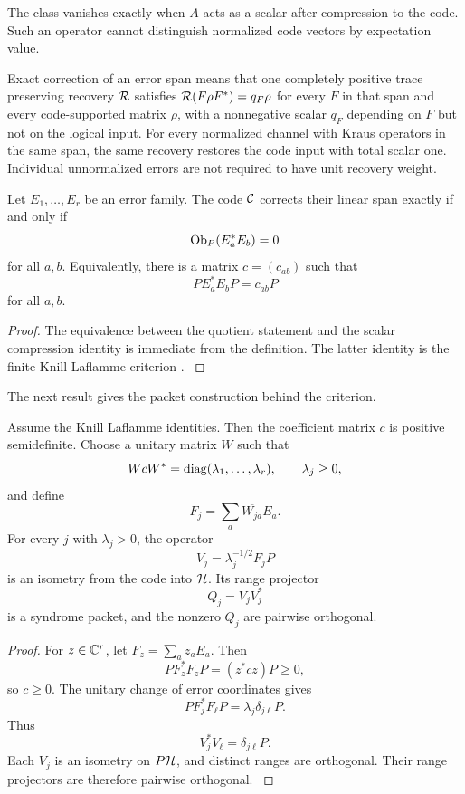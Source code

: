 The class vanishes exactly when \(A\) acts as a scalar after compression to the code. Such an operator cannot distinguish normalized code vectors by expectation value.

Exact correction of an error span means that one completely positive trace preserving recovery $\Rcal$ satisfies $\Rcal(F\rho F^*)=q_F\rho$ for every $F$ in that span and every code-supported matrix $\rho$, with a nonnegative scalar $q_F$ depending on $F$ but not on the logical input. For every normalized channel with Kraus operators in the same span, the same recovery restores the code input with total scalar one. Individual unnormalized errors are not required to have unit recovery weight.

\begin{theorem}\label{strong:theorem:026}\label{strong:thm:kl_obstruction}
Let \(E_1,\ldots,E_r\) be an error family. The code \(\Ccal\) corrects their linear span exactly if and only if
\[
\operatorname{Ob}_P(E_a^*E_b)=0
\]
for all \(a,b\). Equivalently, there is a matrix \(c=(c_{ab})\) such that
\[
PE_a^*E_bP=c_{ab}P
\]
for all \(a,b\).
\end{theorem}

\begin{proof}\label{strong:proof:039}
The equivalence between the quotient statement and the scalar compression identity is immediate from the definition. The latter identity is the finite Knill Laflamme criterion \cite{KnillLaflamme1997,SchumacherNielsen1996}.
\label{strong:proof:039:end}\end{proof}

The next result gives the packet construction behind the criterion.

\begin{theorem}\label{strong:theorem:027}\label{strong:thm:syndrome_construction}
Assume the Knill Laflamme identities. Then the coefficient matrix \(c\) is positive semidefinite. Choose a unitary matrix \(W\) such that
\[
WcW^*=\operatorname{diag}(\lambda_1,\ldots,\lambda_r),
\qquad
\lambda_j\geq0,
\]
and define
\[
F_j=\sum_a\overline{W_{ja}}E_a.
\]
For every \(j\) with \(\lambda_j>0\), the operator
\[
V_j=\lambda_j^{-1/2}F_jP
\]
is an isometry from the code into \(\Hcal\). Its range projector
\[
Q_j=V_jV_j^*
\]
is a syndrome packet, and the nonzero \(Q_j\) are pairwise orthogonal.
\end{theorem}

\begin{proof}\label{strong:proof:040}
For \(z\in\CC^r\), let \(F_z=\sum_az_aE_a\). Then
\[
PF_z^*F_zP=(z^*cz)P\geq0,
\]
so \(c\geq0\). The unitary change of error coordinates gives
\[
PF_j^*F_\ell P
=
\lambda_j\delta_{j\ell}P.
\]
Thus
\[
V_j^*V_\ell=\delta_{j\ell}P.
\]
Each \(V_j\) is an isometry on \(P\Hcal\), and distinct ranges are orthogonal. Their range projectors are therefore pairwise orthogonal.
\label{strong:proof:040:end}\end{proof}

